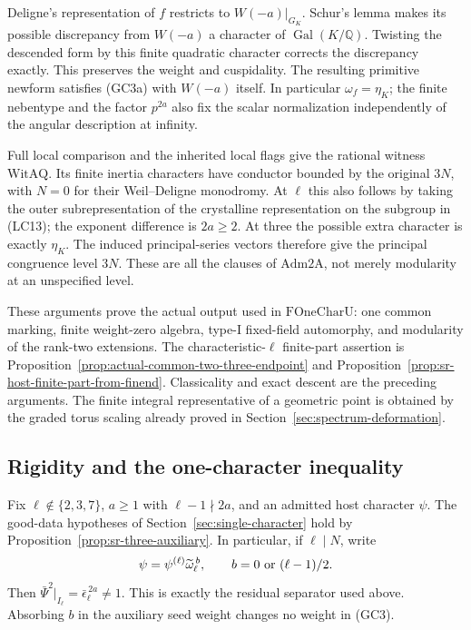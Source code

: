 Deligne's representation of \(f\) restricts
to \(W(-a)|_{G_K}\).
Schur's lemma makes its possible discrepancy
from \(W(-a)\) a character of
\(\operatorname{Gal}(K/\mathbb Q)\).
Twisting the descended form by this finite
quadratic character corrects the discrepancy
exactly. This preserves the weight and
cuspidality. The resulting primitive newform
satisfies (GC3a) with \(W(-a)\) itself.
In particular \(\omega_f=\eta_K\);
the finite nebentype and the factor \(p^{2a}\)
also fix the scalar normalization independently
of the angular description at infinity.

Full local comparison and the inherited local
flags give the rational witness
\(\mathrm{WitAQ}\).
Its finite inertia characters have conductor
bounded by the original \(3N\), with \(N=0\)
for their Weil--Deligne monodromy.
At \(\ell\) this also follows by taking the
outer subrepresentation of the crystalline
representation on the subgroup in (LC13);
the exponent difference is \(2a\ge2\).
At three the possible extra character is
exactly \(\eta_K\).
The induced principal-series vectors therefore
give the principal congruence level \(3N\).
These are all the clauses of
\(\mathrm{Adm2A}\), not merely modularity at
an unspecified level.

These arguments prove the actual
output used in \(\mathrm{FOneCharU}\):
one common marking, finite weight-zero
algebra, type-I fixed-field automorphy,
and modularity of the rank-two extensions.
The characteristic-\(\ell\) finite-part assertion
is Proposition~\ref{prop:actual-common-two-three-endpoint}
and Proposition~\ref{prop:sr-host-finite-part-from-finend}.
Classicality and exact descent are the preceding
arguments. The finite integral representative
of a geometric point is obtained by the graded
torus scaling already proved in
Section~\ref{sec:spectrum-deformation}.

\subsection{Rigidity and the one-character inequality}
Fix \(\ell\notin\{2,3,7\}\), \(a\ge1\) with
\(\ell-1\nmid2a\), and an admitted host character
\(\psi\).
The good-data hypotheses of
Section~\ref{sec:single-character} hold by
Proposition~\ref{prop:sr-three-auxiliary}.
In particular, if \(\ell\mid N\), write
\[
 \psi=\psi^{(\ell)}\widetilde\omega_\ell^{\,b},
 \qquad b=0\ \hbox{or}\ (\ell-1)/2.
\]
Then
\(\bar\Psi^2|_{I_\ell}=\bar\epsilon_\ell^{\,2a}\ne1\).
This is exactly the residual separator used
above. Absorbing \(b\) in the auxiliary seed
weight changes no weight in (GC3).

